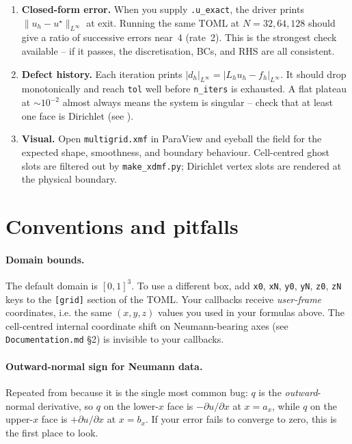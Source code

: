\documentclass[11pt]{article}
\newcommand{\Linf}{L^{\infty}}
\begin{document}
\begin{enumerate}
\item \textbf{Closed-form error.}  When you supply \texttt{.u\_exact},
      the driver prints $\|u_h - u^\star\|_{\Linf}$ at exit.  Running
      the same TOML at $N = 32, 64, 128$ should give a ratio of
      successive errors near~4 (rate~2).  This is the strongest check
      available -- if it passes, the discretisation, BCs, and RHS are
      all consistent.

\item \textbf{Defect history.}  Each iteration prints
      $|d_h|_{\Linf} = |L_h u_h - f_h|_{\Linf}$.  It should drop
      monotonically and reach \texttt{tol} well before
      \texttt{n\_iters} is exhausted.  A flat plateau at $\sim 10^{-2}$
      almost always means the system is singular -- check that at
      least one face is Dirichlet (see ).

\item \textbf{Visual.}  Open \texttt{multigrid.xmf} in ParaView and
      eyeball the field for the expected shape, smoothness, and
      boundary behaviour.  Cell-centred ghost slots are filtered out
      by \texttt{make\_xdmf.py}; Dirichlet vertex slots are rendered
      at the physical boundary.
\end{enumerate}

\section{Conventions and pitfalls}\label{sec:pitfalls}

\paragraph{Domain bounds.}
The default domain is $[0,1]^3$.  To use a different box, add
\texttt{x0}, \texttt{xN}, \texttt{y0}, \texttt{yN}, \texttt{z0},
\texttt{zN} keys to the \texttt{[grid]} section of the TOML.  Your
callbacks receive \emph{user-frame} coordinates, i.e. the same
$(x,y,z)$ values you used in your formulas above.  The cell-centred
internal coordinate shift on Neumann-bearing axes (see
\texttt{Documentation.md} \S2) is invisible to your callbacks.

\paragraph{Outward-normal sign for Neumann data.}
Repeated from  because it is the single most
common bug: $q$ is the \emph{outward}-normal derivative, so $q$ on
the lower-$x$ face is $-\partial u/\partial x$ at $x = a_x$, while
$q$ on the upper-$x$ face is $+\partial u/\partial x$ at $x = b_x$.
If your error fails to converge to zero, this is the first place to
look.
\end{document}
